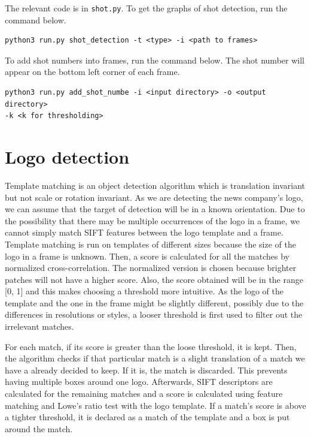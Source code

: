 \documentclass{article}
\begin{document}
The relevant code is in \texttt{shot.py}. To get the graphs of shot detection, run the command below. 
\begin{verbatim}
python3 run.py shot_detection -t <type> -i <path to frames>
\end{verbatim}

To add shot numbers into frames, run the command below. The shot number will appear on the bottom left corner of each frame.
\begin{verbatim}
python3 run.py add_shot_numbe -i <input directory> -o <output directory> 
-k <k for thresholding>
\end{verbatim}

\section{Logo detection}
Template matching is an object detection algorithm which is translation invariant but not scale or rotation invariant. As we are detecting the news company's logo, we can assume that the target of detection will be in a known orientation. Due to the possibility that there may be multiple occurrences of the logo in a frame, we cannot simply match SIFT features between the logo template and a frame. Template matching is run on templates of different sizes because the size of the logo in a frame is unknown. Then, a score is calculated for all the matches by normalized cross-correlation. The normalized version is chosen because brighter patches will not have a higher score. Also, the score obtained will be in the range [0, 1] and this makes choosing a threshold more intuitive. As the logo of the template and the one in the frame might be slightly different, possibly due to the differences in resolutions or styles, a looser threshold is first used to filter out the irrelevant matches. 

For each match, if its score is greater than the loose threshold, it is kept. Then, the algorithm checks if that particular match is a slight translation of a match we have a already decided to keep. If it is, the match is discarded. This prevents having multiple boxes around one logo. Afterwards, SIFT descriptors are calculated for the remaining matches and a score is calculated using feature matching and Lowe's ratio test with the logo template. If a match's score is above a tighter threshold, it is declared as a match of the template and a box is put around the match.
\end{document}
